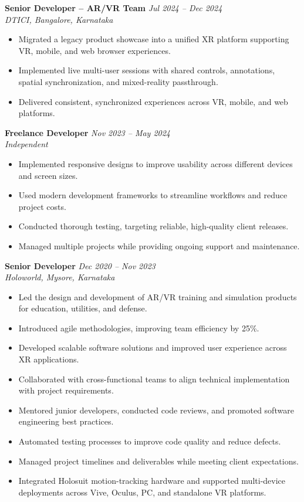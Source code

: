 \documentclass[a4paper,10pt]{article}
\newcommand{\experience}[4]{
    \textbf{#1} \hfill \textit{#2}\\
    \textit{#3}\\[-3pt]
    #4
    \vspace{3pt}
}
\begin{document}
\experience
{Senior Developer -- AR/VR Team}
{Jul 2024 -- Dec 2024}
{DTICI, Bangalore, Karnataka}
{
\begin{itemize}
    \item Migrated a legacy product showcase into a unified XR platform
          supporting VR, mobile, and web browser experiences.
    \item Implemented live multi-user sessions with shared controls,
          annotations, spatial synchronization, and mixed-reality
          passthrough.
    \item Delivered consistent, synchronized experiences across VR,
          mobile, and web platforms.
\end{itemize}
}

\experience
{Freelance Developer}
{Nov 2023 -- May 2024}
{Independent}
{
\begin{itemize}
    \item Implemented responsive designs to improve usability across
          different devices and screen sizes.
    \item Used modern development frameworks to streamline workflows
          and reduce project costs.
    \item Conducted thorough testing, targeting reliable, high-quality
          client releases.
    \item Managed multiple projects while providing ongoing support
          and maintenance.
\end{itemize}
}

\experience
{Senior Developer}
{Dec 2020 -- Nov 2023}
{Holoworld, Mysore, Karnataka}
{
\begin{itemize}
    \item Led the design and development of AR/VR training and
          simulation products for education, utilities, and defense.
    \item Introduced agile methodologies, improving team efficiency
          by 25\%.
    \item Developed scalable software solutions and improved user
          experience across XR applications.
    \item Collaborated with cross-functional teams to align technical
          implementation with project requirements.
    \item Mentored junior developers, conducted code reviews, and
          promoted software engineering best practices.
    \item Automated testing processes to improve code quality and
          reduce defects.
    \item Managed project timelines and deliverables while meeting
          client expectations.
    \item Integrated Holosuit motion-tracking hardware and supported
          multi-device deployments across Vive, Oculus, PC, and
          standalone VR platforms.
\end{itemize}
}
\end{document}
